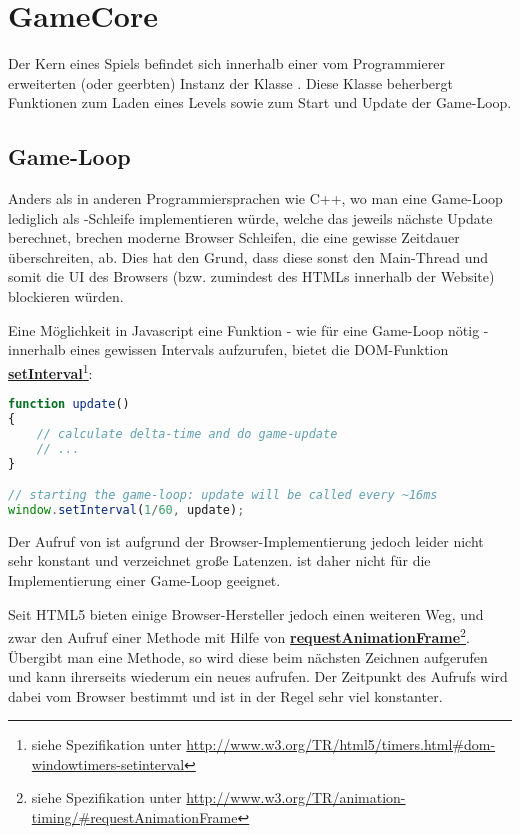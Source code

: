 \chapter{GameCore}

Der Kern eines Spiels befindet sich innerhalb einer vom Programmierer erweiterten (oder geerbten) Instanz der Klasse . Diese Klasse beherbergt Funktionen zum Laden eines Levels sowie zum Start und Update der Game-Loop.

\section{Game-Loop}

Anders als in anderen Programmiersprachen wie C++, wo man eine Game-Loop lediglich als -Schleife implementieren würde, welche das jeweils nächste Update berechnet, brechen moderne Browser Schleifen, die eine gewisse Zeitdauer überschreiten, ab. Dies hat den Grund, dass diese sonst den Main-Thread und somit die UI des Browsers (bzw. zumindest des HTMLs innerhalb der Website) blockieren würden.

Eine Möglichkeit in Javascript eine Funktion -  wie für eine Game-Loop nötig - innerhalb eines gewissen Intervals aufzurufen, bietet die DOM-Funktion \textbf{\href{http://www.w3.org/TR/html5/timers.html\#dom-windowtimers-setinterval}{setInterval}}\footnote{siehe Spezifikation unter \url{http://www.w3.org/TR/html5/timers.html\#dom-windowtimers-setinterval}}:

\begin{lstlisting}[language=JavaScript, caption=Implementierung einer Game-Loop mit \textprog{setInterval}]
function update()
{
	// calculate delta-time and do game-update
	// ...
}

// starting the game-loop: update will be called every ~16ms
window.setInterval(1/60, update);
\end{lstlisting}

Der Aufruf von  ist aufgrund der Browser-Implementierung jedoch leider nicht sehr konstant und verzeichnet große Latenzen.  ist daher nicht für die Implementierung einer Game-Loop geeignet.

Seit HTML5 bieten einige Browser-Hersteller jedoch einen weiteren Weg, und zwar den Aufruf einer Methode mit Hilfe von \textbf{\href{http://www.w3.org/TR/animation-timing/\#requestAnimationFrame}{requestAnimationFrame}}\footnote{siehe Spezifikation unter \url{http://www.w3.org/TR/animation-timing/\#requestAnimationFrame}}. Übergibt man  eine Methode, so wird diese beim nächsten Zeichnen aufgerufen und kann ihrerseits wiederum ein neues  aufrufen. Der Zeitpunkt des Aufrufs wird dabei vom Browser bestimmt und ist in der Regel sehr viel konstanter.

